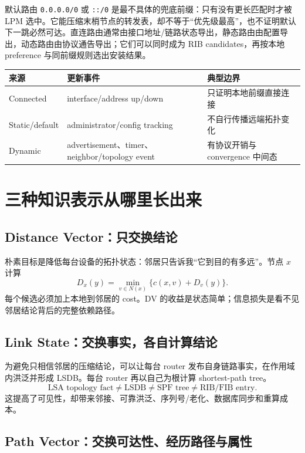 \documentclass[11pt,a4paper]{ctexart}
\newcommand{\code}[1]{\texttt{#1}}
\begin{document}
默认路由 \code{0.0.0.0/0} 或 \code{::/0} 是最不具体的兜底前缀：只有没有更长匹配时才被 LPM 选中。它能压缩末梢节点的转发表，却不等于“优先级最高”，也不证明默认下一跳必然可达。直连路由通常由接口地址/链路状态导出，静态路由由配置导出，动态路由由协议通告导出；它们可以同时成为 RIB candidates，再按本地 preference 与同前缀规则选出安装结果。

\begin{center}\small
\begin{tabularx}{\linewidth}{L{2.2cm}Y Y}
\toprule
来源 & 更新事件 & 典型边界\\
\midrule
Connected & interface/address up/down & 只证明本地前缀直接连接\\
Static/default & administrator/config tracking & 不自行传播远端拓扑变化\\
Dynamic & advertisement、timer、neighbor/topology event & 有协议开销与 convergence 中间态\\
\bottomrule
\end{tabularx}
\end{center}

\section{三种知识表示从哪里长出来}

\subsection{Distance Vector：只交换结论}

朴素目标是降低每台设备的拓扑状态：邻居只告诉我“它到目的有多远”。节点 $x$ 计算
\[
D_x(y)=\min_{v\in N(x)}\{c(x,v)+D_v(y)\}.
\]
每个候选必须加上本地到邻居的 cost。DV 的收益是状态简单；信息损失是看不见邻居结论背后的完整依赖路径。

\subsection{Link State：交换事实，各自计算结论}

为避免只相信邻居的压缩结论，可以让每台 router 发布自身链路事实，在作用域内洪泛并形成 LSDB。每台 router 再以自己为根计算 shortest-path tree。
\[
\boxed{\text{LSA topology fact}\ne\text{LSDB}\ne\text{SPF tree}\ne\text{RIB/FIB entry}}.
\]
这提高了可见性，却带来邻接、可靠洪泛、序列号/老化、数据库同步和重算成本。

\subsection{Path Vector：交换可达性、经历路径与属性}
\end{document}
